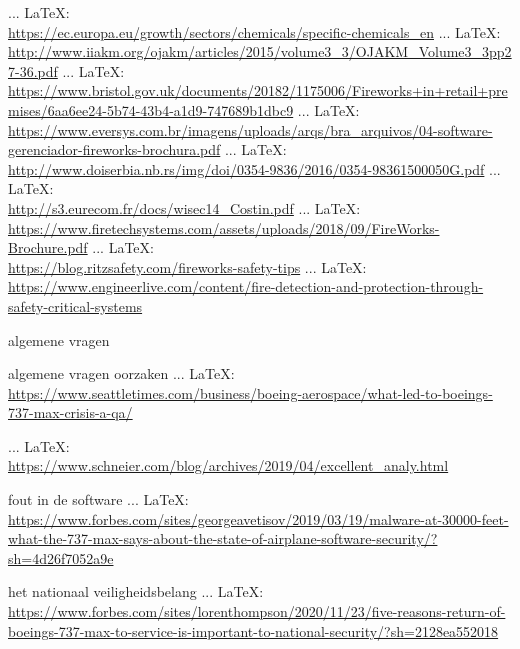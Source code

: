 \begin{thebibliography}{99}
{{{	 ... \LaTeX:\\ \url{https://ec.europa.eu/growth/sectors/chemicals/specific-chemicals_en}
	 ... \LaTeX:\\ \url{http://www.iiakm.org/ojakm/articles/2015/volume3_3/OJAKM_Volume3_3pp27-36.pdf}
	 ... \LaTeX:\\ \url{https://www.bristol.gov.uk/documents/20182/1175006/Fireworks+in+retail+premises/6aa6ee24-5b74-43b4-a1d9-747689b1dbc9}
	 ... \LaTeX:\\ \url{https://www.eversys.com.br/imagens/uploads/arqs/bra_arquivos/04-software-gerenciador-fireworks-brochura.pdf}
	 ... \LaTeX:\\ \url{http://www.doiserbia.nb.rs/img/doi/0354-9836/2016/0354-98361500050G.pdf}
	 ... \LaTeX:\\ \url{http://s3.eurecom.fr/docs/wisec14_Costin.pdf}
	 ... \LaTeX:\\ \url{https://www.firetechsystems.com/assets/uploads/2018/09/FireWorks-Brochure.pdf}
	 ... \LaTeX:\\ \url{https://blog.ritzsafety.com/fireworks-safety-tips}
	 ... \LaTeX:\\ \url{https://www.engineerlive.com/content/fire-detection-and-protection-through-safety-critical-systems}
    
    algemene vragen
    
    algemene vragen
    oorzaken
     ... \LaTeX:\\ \url{https://www.seattletimes.com/business/boeing-aerospace/what-led-to-boeings-737-max-crisis-a-qa/}
    
     ... \LaTeX:\\ \url{https://www.schneier.com/blog/archives/2019/04/excellent_analy.html}
    
    fout in de software
     ... \LaTeX:\\ \url{https://www.forbes.com/sites/georgeavetisov/2019/03/19/malware-at-30000-feet-what-the-737-max-says-about-the-state-of-airplane-software-security/?sh=4d26f7052a9e}
    
    het nationaal veiligheidsbelang
     ... \LaTeX:\\ \url{https://www.forbes.com/sites/lorenthompson/2020/11/23/five-reasons-return-of-boeings-737-max-to-service-is-important-to-national-security/?sh=2128ea552018}
    
}}}
\end{thebibliography}
